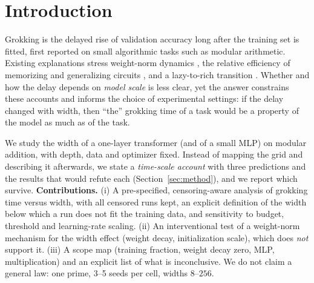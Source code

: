 \documentclass{article}
\begin{document}
\section{Introduction}
\label{sec:intro}
Grokking \citep{power2022grokking} is the delayed rise of validation accuracy long after the training set is fitted, first reported on small algorithmic tasks such as modular arithmetic.
Existing explanations stress weight-norm dynamics \citep{liu2023omnigrok}, the relative efficiency of memorizing and generalizing circuits \citep{varma2023circuit}, and a lazy-to-rich transition \citep{kumar2024grokking}.
Whether and how the delay depends on \emph{model scale} is less clear, yet the answer constrains these accounts and informs the choice of experimental settings: if the delay changed with width, then ``the'' grokking time of a task would be a property of the model as much as of the task.

We study the width of a one-layer transformer (and of a small MLP) on modular addition, with depth, data and optimizer fixed.
Instead of mapping the grid and describing it afterwards, we state a \emph{time-scale account} with three predictions and the results that would refute each (Section~\ref{sec:method}), and we report which survive.
\textbf{Contributions.}
(i) A pre-specified, censoring-aware analysis of grokking time versus width, with all censored runs kept, an explicit definition of the width below which a run does not fit the training data, and sensitivity to budget, threshold and learning-rate scaling.
(ii) An interventional test of a weight-norm mechanism for the width effect (weight decay, initialization scale), which does \emph{not} support it.
(iii) A scope map (training fraction, weight decay zero, MLP, multiplication) and an explicit list of what is inconclusive.
We do not claim a general law: one prime, 3--5 seeds per cell, widths $8$--$256$.
\end{document}
